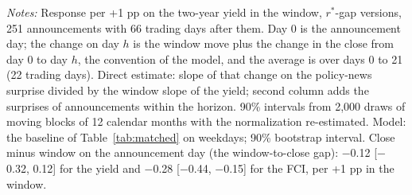 \begin{table}[tp]\centering\footnotesize\setlength{\tabcolsep}{3pt}
\caption{Financial Persistence: Direct Estimates and the Model}\label{tab:persist}
\begin{flushleft}\footnotesize\textit{Notes:} Response per +1 pp on the two-year yield in the window, $r^*$-gap versions, 251 announcements with 66 trading days after them. Day 0 is the announcement day; the change on day $h$ is the window move plus the change in the close from day 0 to day $h$, the convention of the model, and the average is over days 0 to 21 (22 trading days). Direct estimate: slope of that change on the policy-news surprise divided by the window slope of the yield; second column adds the surprises of announcements within the horizon. 90\% intervals from 2,000 draws of moving blocks of 12 calendar months with the normalization re-estimated. Model: the baseline of Table~\ref{tab:matched} on weekdays; 90\% bootstrap interval. Close minus window on the announcement day (the window-to-close gap): $-$0.12 [$-$0.32, 0.12] for the yield and $-$0.28 [$-$0.44, $-$0.15] for the FCI, per +1 pp in the window.\end{flushleft}
\end{table}
